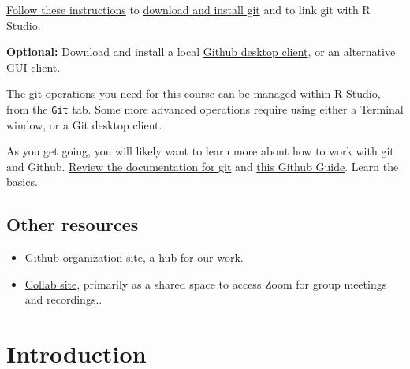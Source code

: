 \documentclass[
]{book}
\providecommand{\tightlist}{%
  \setlength{\itemsep}{0pt}\setlength{\parskip}{0pt}}
\begin{document}
\href{https://jennybc.github.io/2014-05-12-ubc/ubc-r/session03_git.html}{Follow these instructions} to \href{https://git-scm.com/downloads}{download and install git} and to link git with R Studio.

\textbf{Optional:} Download and install a local \href{https://git-scm.com/downloads/guis}{Github desktop client}, or an alternative GUI client.

The git operations you need for this course can be managed within R Studio, from the \texttt{Git} tab. Some more advanced operations require using either a Terminal window, or a Git desktop client.

As you get going, you will likely want to learn more about how to work with git and Github. \href{https://git-scm.com/}{Review the documentation for git} and \href{https://guides.github.com/introduction/flow/}{this Github Guide}. Learn the basics.

\hypertarget{other-resources}{%
\section{Other resources}\label{other-resources}}

\begin{itemize}
\tightlist
\item
  \href{https://github.com/coopercenter}{Github organization site}, a hub for our work.
\item
  \href{https://collab.its.virginia.edu}{Collab site}, primarily as a shared space to access Zoom for group meetings and recordings..
\end{itemize}

\hypertarget{intro}{%
\chapter{Introduction}\label{intro}}
\end{document}
